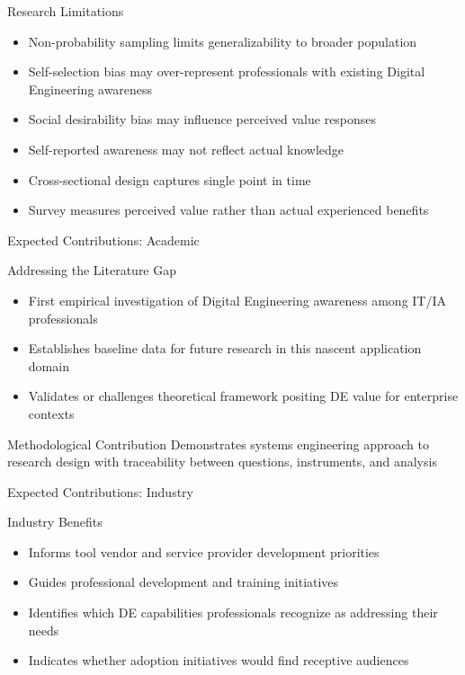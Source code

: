 \documentclass{beamer}
\begin{document}
\begin{frame}[allowframebreaks]{Research Limitations}
  \begin{itemize}
    \item Non-probability sampling limits generalizability to broader population
    \item Self-selection bias may over-represent professionals with existing Digital Engineering awareness
    \item Social desirability bias may influence perceived value responses
    \item Self-reported awareness may not reflect actual knowledge
    \item Cross-sectional design captures single point in time
    \item Survey measures perceived value rather than actual experienced benefits
  \end{itemize}
\end{frame}

\begin{frame}[allowframebreaks]{Expected Contributions: Academic}
  \begin{block}{Addressing the Literature Gap}
    \begin{itemize}
      \item First empirical investigation of Digital Engineering awareness among IT/IA professionals
      \item Establishes baseline data for future research in this nascent application domain
      \item Validates or challenges theoretical framework positing DE value for enterprise contexts
    \end{itemize}
  \end{block}

  \begin{block}{Methodological Contribution}
    Demonstrates systems engineering approach to research design with traceability between questions, instruments, and analysis
  \end{block}
\end{frame}

\begin{frame}[allowframebreaks]{Expected Contributions: Industry}
  \begin{block}{Industry Benefits}
    \begin{itemize}
      \item Informs tool vendor and service provider development priorities
      \item Guides professional development and training initiatives
      \item Identifies which DE capabilities professionals recognize as addressing their needs
      \item Indicates whether adoption initiatives would find receptive audiences
    \end{itemize}
  \end{block}
\end{frame}
\end{document}
